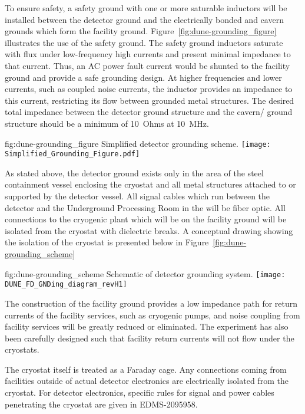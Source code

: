 To ensure safety, a safety ground with one or more saturable inductors
will be installed between the detector ground and the electrically
bonded  and cavern grounds which form the facility ground.
Figure~\ref{fig:dune-grounding_figure} illustrates the use of the
safety ground. The safety ground inductors saturate with flux under
low-frequency high currents and present minimal impedance to that
current.  Thus, an AC power fault current would be shunted to the
facility ground and provide a safe grounding design. At higher
frequencies and lower currents, such as coupled noise currents, the
inductor provides an impedance to this current, restricting its flow
between grounded metal structures. The desired total impedance between
the detector ground structure and the cavern/ ground
structure should be a minimum of \SI{10}{Ohms} at \SI{10}{MHz}.
\begin{dunefigure}{fig:dune-grounding_figure}
  {Simplified detector grounding scheme.}
  \texttt{[image: Simplified\_Grounding\_Figure.pdf]}
\end{dunefigure}

As stated above, the detector ground exists only in the area of the
steel containment vessel enclosing the cryostat and all metal
structures attached to or supported by the detector vessel.  All
signal cables which run between the detector and the  Underground
Processing Room in the  will be fiber optic.
All connections to the cryogenic plant which will be on the facility
ground will be isolated from the cryostat with dielectric breaks.  A
conceptual drawing showing the isolation of the cryostat is presented
below in Figure~\ref{fig:dune-grounding_scheme}
\begin{dunefigure}{fig:dune-grounding_scheme}
  {Schematic of detector grounding system.}
  \texttt{[image: DUNE\_FD\_GNDing\_diagram\_revH1]}
\end{dunefigure}

The construction of the facility ground provides a low impedance path
for return currents of the facility services, such as cryogenic pumps,
and noise coupling from facility services will be greatly reduced or
eliminated.  The experiment has also been carefully designed such that
facility return currents will not flow under the cryostats.

The cryostat itself is treated as a Faraday cage.  Any connections
coming from facilities outside of actual detector electronics are
electrically isolated from the cryostat.  For detector electronics,
specific rules for signal and power cables penetrating the cryostat
are given in EDMS-2095958\cite{bib:cernedms2095958}.





